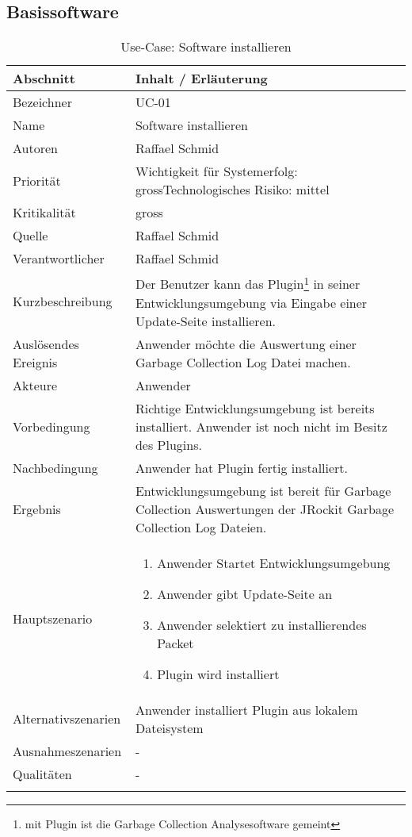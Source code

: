 \subsection{Basissoftware}
\begin{longtable}{|p{4cm}|p{10.5cm}|}
  \hline
   \textbf{Abschnitt} & \textbf{Inhalt / Erläuterung} \\\hline
   Bezeichner & UC-01\\\hline
   Name & Software installieren\\\hline
   Autoren & Raffael Schmid\\\hline
   Priorität & Wichtigkeit für Systemerfolg: gross\newline Technologisches Risiko: mittel\\\hline
   Kritikalität & gross\\\hline
   Quelle & Raffael Schmid\\\hline
   Verantwortlicher & Raffael Schmid\\\hline
   Kurzbeschreibung & Der Benutzer kann das Plugin\footnote{mit Plugin ist die Garbage Collection Analysesoftware gemeint} in seiner Entwicklungsumgebung via Eingabe einer Update-Seite installieren.\\\hline
   Auslösendes Ereignis & Anwender möchte die Auswertung einer Garbage Collection Log Datei machen.\\\hline
   Akteure & Anwender\\\hline
   Vorbedingung & Richtige Entwicklungsumgebung ist bereits installiert. Anwender ist noch nicht im Besitz des Plugins.\\\hline
   Nachbedingung & Anwender hat Plugin fertig installiert.\\\hline
   Ergebnis & Entwicklungsumgebung ist bereit für Garbage Collection Auswertungen der JRockit Garbage Collection Log Dateien.\\\hline
   Hauptszenario & 
         \begin{enumerate}
		\item Anwender Startet Entwicklungsumgebung
		\item Anwender gibt Update-Seite an
		\item Anwender selektiert zu installierendes Packet
		\item Plugin wird installiert	
 	\end{enumerate}
	\\\hline
   Alternativszenarien & Anwender installiert Plugin aus lokalem Dateisystem\\\hline
   Ausnahmeszenarien & -\\\hline
   Qualitäten & -\\\hline
\caption{Use-Case: Software installieren}
\end{longtable}

